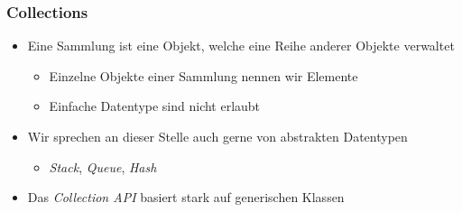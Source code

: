 \begin{frame}[fragile]
    \frametitle<presentation>{Collections}
    \begin{itemize}
        \item Eine Sammlung ist eine Objekt, welche eine Reihe anderer
            Objekte verwaltet
        \begin{itemize}
            \item Einzelne Objekte einer Sammlung nennen wir Elemente
            \item Einfache Datentype sind nicht erlaubt
        \end{itemize}
        \item Wir sprechen an dieser Stelle auch gerne von abstrakten Datentypen
        \begin{itemize}
            \item \emph{Stack}, \emph{Queue}, \emph{Hash}
        \end{itemize}
        \item Das \emph{Collection API} basiert stark auf generischen Klassen
    \end{itemize}
\end{frame}


